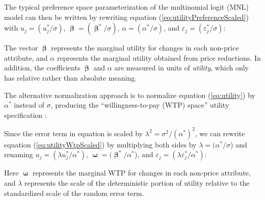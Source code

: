 \documentclass[article]{jss}
\begin{document}


The typical preference space parameterization of the multinomial logit
(MNL) model can then be written by rewriting equation
(\ref{eq:utilityPreferenceScaled}) with \(u_j = (u^*_j / \sigma)\),
\(\boldsymbol\upbeta= (\boldsymbol\upbeta^{*} / \sigma)\),
\(\alpha = (\alpha^{*} / \sigma)\), and
\(\varepsilon_{j} = (\varepsilon^{*}_{j} / \sigma)\):



The vector \(\boldsymbol\upbeta\) represents the marginal utility for
changes in each non-price attribute, and \(\alpha\) represents the
marginal utility obtained from price reductions. In addition, the
coefficients \(\boldsymbol\upbeta\) and \(\alpha\) are measured in units
of \emph{utility}, which only has relative rather than absolute meaning.

The alternative normalization approach is to normalize equation
(\ref{eq:utility}) by \(\alpha^*\) instead of \(\sigma\), producing the
``willingness-to-pay (WTP) space'' utility specification
\citep{Train2005}:



Since the error term in equation is scaled by
\(\lambda^2 = \sigma^2/(\alpha^{*})^2\), we can rewrite equation
(\ref{eq:utilityWtpScaled}) by multiplying both sides by
\(\lambda= (\alpha^{*} / \sigma\)) and renaming
\(u_j = (\lambda u^*_j / \alpha^*)\),
\(\boldsymbol\upomega= (\boldsymbol\upbeta^{*} / \alpha^{*}\)), and
\(\varepsilon_j = (\lambda \varepsilon^*_j / \alpha^*)\):



Here \(\boldsymbol\upomega\) represents the marginal WTP for changes in
each non-price attribute, and \(\lambda\) represents the scale of the
deterministic portion of utility relative to the standardized scale of
the random error term.


\end{document}
